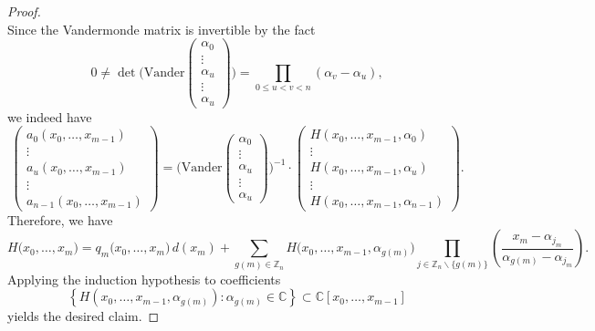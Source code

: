 \begin{proof}
\begin{equation}
\end{equation}
Since the Vandermonde matrix is invertible by the fact
\begin{equation}
0\ne\det\bigg(\text{Vander}\left(\begin{array}{c}
\alpha_{0}\\
\vdots\\
\alpha_{u}\\
\vdots\\
\alpha_{u}
\end{array}\right)\bigg)=\prod_{0\le u<v<n}(\alpha_{v}-\alpha_{u}),
 \end{equation}
we indeed have 
\begin{equation}
\left(\begin{array}{c}
a_{0}\left(x_{0},\ldots,x_{m-1}\right)\\
\vdots\\
a_{u}\left(x_{0},\ldots,x_{m-1}\right)\\
\vdots\\
a_{n-1}\left(x_{0},\ldots,x_{m-1}\right)
\end{array}\right)=\bigg(\text{Vander}\left(\begin{array}{c}
\alpha_{0}\\
\vdots\\
\alpha_{u}\\
\vdots\\
\alpha_{u}
\end{array}\right)\bigg)^{-1}\cdot\left(\begin{array}{c}
H(x_{0},\ldots,x_{m-1},\alpha_{0})\\
\vdots\\
H(x_{0},\ldots,x_{m-1},\alpha_{u})\\
\vdots\\
H(x_{0},\ldots,x_{m-1},\alpha_{n-1})
\end{array}\right).
\end{equation}
Therefore, we have 
\begin{equation}
H\big(x_{0},\ldots,x_{m}\big)
= q_{m}\big(x_{0},\ldots,x_{m}\big)\,d(x_{m})+\sum_{g(m)\in\mathbb{Z}_{n}}H\big(x_{0},\ldots,x_{m-1},\alpha_{g(m)}\big)\prod_{j\in\mathbb{Z}_{n}\backslash\{g(m)\}}\left(\frac{x_{m}-\alpha_{j_{m}}}{\alpha_{g(m)}-\alpha_{j_{m}}}\right).
\end{equation}
Applying the induction hypothesis to coefficients
\[
\left\{ H\left(x_{0},\ldots,x_{m-1},\alpha_{g\left(m\right)}\right): \alpha_{g\left(m\right)}\in\mathbb{C}\right\} \subset\mathbb{C}[x_{0},\ldots,x_{m-1}]
\]
yields the desired claim.
\end{proof}
